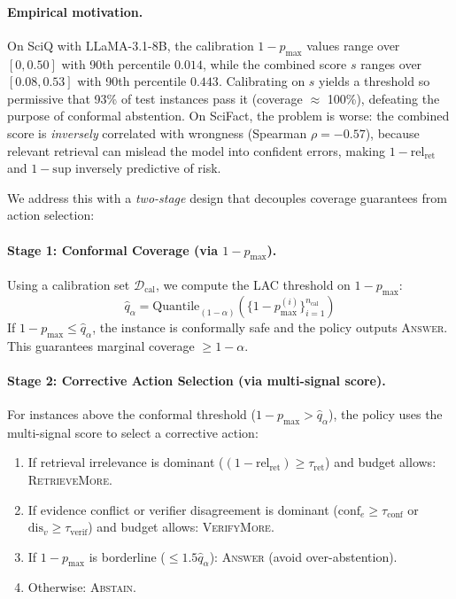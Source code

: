 \documentclass[letterpaper]{article}
\begin{document}
\paragraph{Empirical motivation.}
On SciQ with LLaMA-3.1-8B, the calibration $1-p_{\max}$ values range over $[0, 0.50]$ with 90th percentile $0.014$, while the combined score $s$ ranges over $[0.08, 0.53]$ with 90th percentile $0.443$. Calibrating on $s$ yields a threshold so permissive that 93\% of test instances pass it (coverage $\approx$ 100\%), defeating the purpose of conformal abstention. On SciFact, the problem is worse: the combined score is \emph{inversely} correlated with wrongness (Spearman $\rho = -0.57$), because relevant retrieval can mislead the model into confident errors, making $1-\text{rel}_{\text{ret}}$ and $1-\text{sup}$ inversely predictive of risk.

We address this with a \emph{two-stage} design that decouples coverage guarantees from action selection:

\paragraph{Stage 1: Conformal Coverage (via $1-p_{\max}$).}
Using a calibration set $\mathcal{D}_{\text{cal}}$, we compute the LAC threshold on $1-p_{\max}$:
\begin{equation}
\hat{q}_\alpha = \text{Quantile}_{(1-\alpha)}\left(\{1 - p_{\max}^{(i)}\}_{i=1}^{n_{\text{cal}}}\right)
\end{equation}
If $1 - p_{\max} \leq \hat{q}_\alpha$, the instance is conformally safe and the policy outputs \textsc{Answer}. This guarantees marginal coverage $\geq 1-\alpha$.

\paragraph{Stage 2: Corrective Action Selection (via multi-signal score).}
For instances above the conformal threshold ($1 - p_{\max} > \hat{q}_\alpha$), the policy uses the multi-signal score to select a corrective action:
\begin{enumerate}
    \item If retrieval irrelevance is dominant ($(1 - \text{rel}_{\text{ret}}) \geq \tau_{\text{ret}}$) and budget allows: \textsc{RetrieveMore}.
    \item If evidence conflict or verifier disagreement is dominant ($\text{conf}_e \geq \tau_{\text{conf}}$ or $\text{dis}_v \geq \tau_{\text{verif}}$) and budget allows: \textsc{VerifyMore}.
    \item If $1-p_{\max}$ is borderline ($\leq 1.5\hat{q}_\alpha$): \textsc{Answer} (avoid over-abstention).
    \item Otherwise: \textsc{Abstain}.
\end{enumerate}
\end{document}
